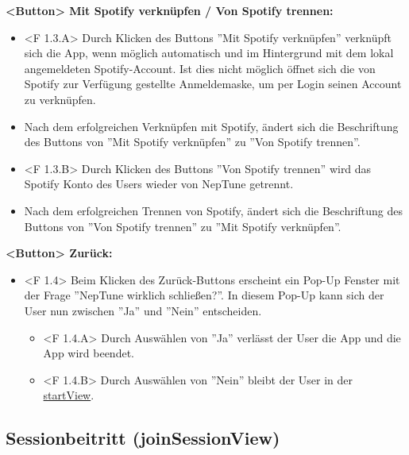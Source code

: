 \documentclass[oneside, ngerman]{sdqtechreport}
\begin{document}
\textbf{<Button> Mit Spotify verknüpfen / Von Spotify trennen:}
\begin{itemize}
    \hypertarget{<F 1.3.A>}{}
    \item <F 1.3.A> Durch Klicken des Buttons ''Mit Spotify verknüpfen'' verknüpft sich die App, wenn möglich automatisch und im Hintergrund mit dem lokal angemeldeten Spotify-Account. Ist dies nicht möglich öffnet sich die von Spotify zur Verfügung gestellte Anmeldemaske, um per Login seinen Account zu verknüpfen.
    \item Nach dem erfolgreichen Verknüpfen mit Spotify, ändert sich die Beschriftung des Buttons von ''Mit Spotify verknüpfen'' zu ''Von Spotify trennen''.
    \hypertarget{<F 1.3.B>}{}
    \item <F 1.3.B> Durch Klicken des Buttons ''Von Spotify trennen'' wird das Spotify Konto des Users wieder von NepTune getrennt.
    \item Nach dem erfolgreichen Trennen von Spotify, ändert sich die Beschriftung des Buttons von ''Von Spotify trennen'' zu ''Mit Spotify verknüpfen''.
\end{itemize}

\textbf{<Button> Zurück:}
\begin{itemize}
\hypertarget{<F 1.4>}{}
    \item <F 1.4> Beim Klicken des Zurück-Buttons erscheint ein Pop-Up Fenster mit der Frage ''NepTune wirklich schließen?''. In diesem Pop-Up kann sich der User nun zwischen ''Ja'' und ''Nein'' entscheiden.
    \begin{itemize}
        \hypertarget{<F 1.4.A>}{}
        \item <F 1.4.A> Durch Auswählen von ''Ja'' verlässt der User die App und die App wird beendet.
        \hypertarget{<F 1.4.B>}{}
        \item <F 1.4.B> Durch Auswählen von ''Nein'' bleibt der User in der \hyperlink{startView}{startView}.
    \end{itemize}
\end{itemize}



\subsection{Sessionbeitritt (joinSessionView)}
\label{sec:Benutzeroberfläche:joinSessionView}
\end{document}
